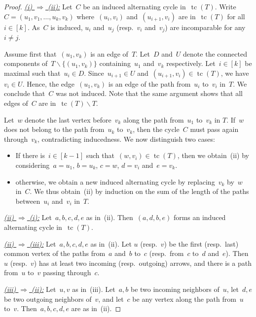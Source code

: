 \documentclass{amsart}
\theoremstyle{definition}
\newcommand{\ssm}{\smallsetminus} %
\DeclareMathOperator{\tc}{tc} %
\begin{document}
\begin{proof}
\uline{\textsl{(i) $\Rightarrow$ (ii):}}
Let~$C$ be an induced alternating cycle in~$\tc(T)$.
Write~$C = (u_1, v_1, \dots, u_k, v_k)$ where~$(u_i, v_i)$ and~$(u_{i+1}, v_i)$ are in~$\tc(T)$ for all~$i \in [k]$.
As~$C$ is induced, $u_i$ and~$u_j$ (resp.~$v_i$ and~$v_j$) are incomparable for any~$i \ne j$.

Assume first that~$(u_1, v_k)$ is an edge of~$T$.
Let~$D$ and~$U$ denote the connected components of~$T \ssm \{(u_1, v_k)\}$ containing~$u_1$ and~$v_k$ respectively.
Let~$i \in [k]$ be maximal such that~$u_i \in D$.
Since~$u_{i+1} \in U$ and~$(u_{i+1}, v_i) \in \tc(T)$, we have~$v_i \in U$.
Hence, the edge~$(u_1, v_k)$ is an edge of the path from~$u_i$ to~$v_i$ in~$T$.
We conclude that~$C$ was not induced.
Note that the same argument shows that all edges of~$C$ are in~$\tc(T) \ssm T$.

Let~$w$ denote the last vertex before~$v_k$ along the path from~$u_1$ to~$v_k$ in $T$.
If~$w$ does not belong to the path from~$u_k$ to~$v_k$, then the cycle~$C$ must pass again through~$v_k$, contradicting inducedness.
We now distinguish two cases:
\begin{itemize}
\item If there is~$i \in [k-1]$ such that~$(w,v_i) \in \tc(T)$, then we obtain~(ii) by considering~$a = u_1$, $b = u_k$, $c = w$, $d = v_i$ and~$e = v_k$.
\item otherwise, we obtain a new induced alternating cycle by replacing~$v_k$ by~$w$ in~$C$. We thus obtain~(ii) by induction on the sum of the length of the paths between~$u_i$ and~$v_i$ in~$T$.
\qedhere
\end{itemize}

\medskip\noindent
\uline{\textsl{(ii) $\Rightarrow$ (i):}} Let~$a,b,c,d,e$ as in~(ii). Then~$(a,d,b,e)$ forms an induced alternating cycle in~$\tc(T)$.

\medskip\noindent
\uline{\textsl{(ii) $\Rightarrow$ (iii):}} Let~$a,b,c,d,e$ as in~(ii). Let $u$ (resp.~$v$) be the first (resp.~last) common vertex of the paths from~$a$ and~$b$ to~$c$ (resp.~from~$c$ to~$d$ and~$e$). Then~$u$ (resp.~$v$) has at least two incoming (resp.~outgoing) arrows, and there is a path from~$u$ to~$v$ passing through~$c$.

\medskip\noindent
\uline{\textsl{(iii) $\Rightarrow$ (ii):}} Let~$u,v$ as in~(iii). Let~$a,b$ be two incoming neighbors of~$u$, let~$d,e$ be two outgoing neighbors of~$v$, and let~$c$ be any vertex along the path from~$u$ to~$v$. Then~$a,b,c,d,e$ are as in~(ii).
\end{proof}
\end{document}
